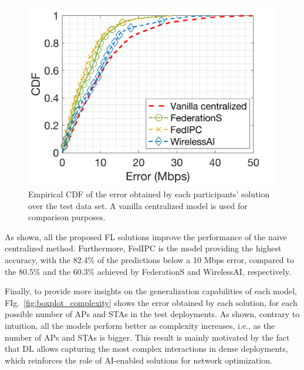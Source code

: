 \documentclass[10pt,a4paper,twocolumn]{article}
\newcommand{\ITUpar}{\vspace{8pt}\par}
\def\startfigure{\vspace{6pt}\begin{figure}[ht]\center}
\begin{document}
\startfigure
\centering
\includegraphics[width=.7\columnwidth]{img/fed_results}
\caption{Empirical CDF of the error obtained by each participants' solution over the test data set. A vanilla centralized model is used for comparison purposes.}
\label{fig:summary_results}
\end{figure} 

As shown, all the proposed FL solutions improve the performance of the naive centralized method. Furthermore, FedIPC is the model providing the highest accuracy, with the 82.4\% of the predictions below a 10 Mbps error, compared to the 80.5\% and the 60.3\% achieved by FederationS and WirelessAI, respectively.\ITUpar

Finally, to provide more insights on the generalization capabilities of each model, FIg.~\ref{fig:boxplot_complexity} shows the error obtained by each solution, for each possible number of APs and STAs in the test deployments. As shown, contrary to intuition, all the models perform better as complexity increases, i.e., as the number of APs and STAs is bigger. This result is mainly motivated by the fact that DL allows capturing the most complex interactions in dense deployments, which reinforces the role of AI-enabled solutions for network optimization.
\end{document}
